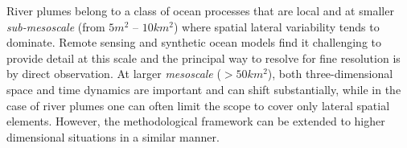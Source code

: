 \documentclass[aoas]{imsart}
\begin{document}




River plumes belong to a class of ocean processes that are local and
at smaller \emph{sub-mesoscale} (from $5 m^2$ -- $10 km^2$) where
spatial lateral variability tends to dominate. Remote sensing and
synthetic ocean models find it challenging to provide detail at this
scale \citep{Lermusiaux:2006} and the principal way to resolve for
fine resolution is by direct observation. At larger \emph{mesoscale}
($>50 km^2$), both three-dimensional space and time dynamics are
important and can shift substantially, while in the case of river
plumes one can often limit the scope to cover only lateral spatial
elements. However, the methodological framework can be extended to
higher dimensional situations in a similar manner.
\end{document}
